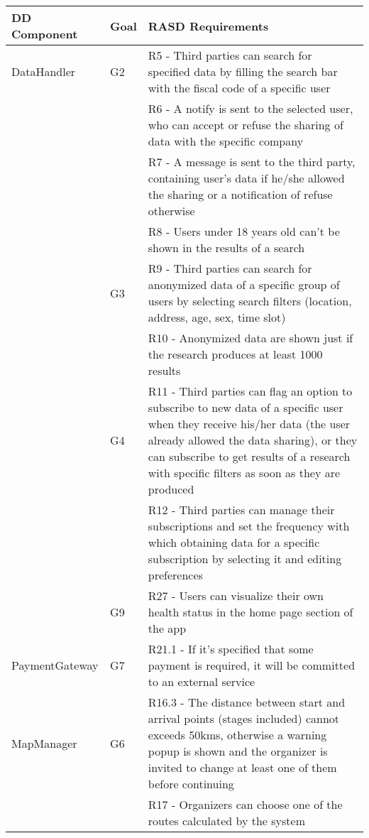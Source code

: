\begin{table}[]
\begin{adjustbox}{width=\textwidth}
\begin{tabular}{|p{}|p{}|p{}|}
\hline
\textbf{DD Component} & \textbf{Goal} & \textbf{RASD Requirements}\\ \hline					
DataHandler			& G2	 & R5 - Third parties can search for specified data by filling the search bar with the fiscal code of a specific user \\[10pt]
					&		& R6 -	A notify is sent to the selected user, who can accept or refuse the sharing of data with the specific company \\[10pt]
					&		& R7 - A message is sent to the third party, containing user's data if he/she allowed the sharing or a notification of refuse otherwise	\\[10pt]
					&		& R8 - Users under 18 years old can't be shown in the results of a search	\\[10pt]
					& G3	 & R9 - Third parties can search for anonymized data of a specific group of users by selecting search filters (location, address, age, sex, time slot) \\[10pt]
					&		& R10 - Anonymized data are shown just if the research produces at least 1000 results	 \\[10pt]
					& G4	 & R11 -	Third parties can flag an option to subscribe to new data of a specific user when they receive his/her data (the user already allowed the data sharing), or they can subscribe to get results of a research with specific filters as soon as they are produced \\[10pt]
					&		& R12 - Third parties can manage their subscriptions and set the frequency with which obtaining data for a specific subscription by selecting it and editing preferences	\\[10pt]
					& G9	 & R27 - Users can visualize their own health status in the home page section of the app	\\[10pt] \hline
PaymentGateway		& G7	 & R21.1	 - If it's specified that some payment is required, it will be committed to an external service \\[10pt] \hline
MapManager			& G6	 & R16.3 - The distance between start and arrival points (stages included) cannot exceeds 50kms, otherwise a warning popup is shown and the organizer is invited to change at least one of them before continuing \\[10pt]
					&		& R17 - Organizers can choose one of the routes calculated by the system \\[10pt]

\end{tabular}
\end{adjustbox}
\end{table}
